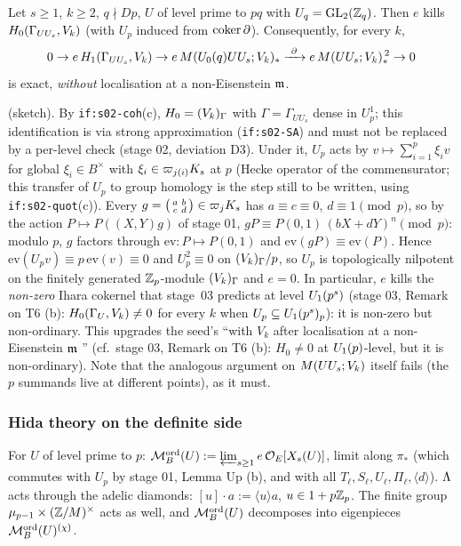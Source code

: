 \begin{proposition}\label{prop:s04-ekillsVk}
Let $s\ge1$, $k\ge2$, $q\nmid Dp$, $U$ of level prime to $pq$ with $U_q=\mathrm{GL}_2(\mathbb{Z}_q)$. Then $e$ kills $H_0(\Gamma_{UU_s},V_k)$ (with
$U_p$ induced from $\operatorname{coker}\partial$). Consequently, for every $k$,
\[0\to e\,H_1(\Gamma_{UU_s},\Vk)\to e\,\Brandt{\Uzero{q}UU_s}{\Vk}_*\xrightarrow{\ \partial\ }e\,\Brandt{UU_s}{\Vk}_*^{\,2}\to0\]
is exact, \emph{without} localisation at a non-Eisenstein $\mathfrak{m}$.
\end{proposition}
\noindent\sttoprove{} (sketch). By \texttt{if:s02-coh}(c), $H_0=(V_k)_{\Gamma}$ with $\Gamma=\Gamma_{UU_s}$ dense in
$U^1_p$; this identification is \stpmc{} via strong approximation (\texttt{if:s02-SA}) and must not be replaced by a per-level
check (stage 02, deviation D3). Under it, $U_p$ acts by $v\mapsto\sum_{i=1}^{p}\xi_iv$ for global $\xi_i\in B^\times$ with
$\xi_i\in\varpi_{j(i)}K_{s}$ at $p$ (Hecke operator of the commensurator; this transfer of $U_p$ to group homology is the step
still to be written, using \texttt{if:s02-quot}(c)). Every $g=\left(\begin{smallmatrix}a&b\\c&d\end{smallmatrix}\right)\in\varpi_jK_{s}$
has $a\equiv c\equiv0$, $d\equiv1\pmod p$, so by the action $P\mapsto P((X,Y)g)$ of stage 01, $gP\equiv P(0,1)\,(bX+dY)^n\pmod p$: modulo $p$, $g$ factors
through $\mathrm{ev}:P\mapsto P(0,1)$ and $\mathrm{ev}(gP)\equiv\mathrm{ev}(P)$. Hence $\mathrm{ev}(U_pv)\equiv p\,\mathrm{ev}(v)\equiv0$ and
$U_p^2\equiv0$ on $(V_k)_\Gamma/p$, so $U_p$ is topologically nilpotent on the finitely generated $\mathbb{Z}_p$-module $(V_k)_\Gamma$ and $e=0$.
In particular, $e$ kills the \emph{non-zero} Ihara cokernel that stage~03 predicts at level $U_1(p^s)$ (stage 03, Remark on
T6 (b): $H_0(\Gamma_U,V_k)\ne0$ for every $k$ when $U_p\subseteq U_1(p^s)_p$): it is non-zero but non-ordinary.
This upgrades the seed's ``with $V_k$ after localisation at a non-Eisenstein $\mathfrak{m}$ \stsketch'' (cf.\ stage 03, Remark on T6 (b):
$H_0\ne0$ at $U_1(p)$-level, but it is non-ordinary). Note that the analogous argument on $M(UU_s;V_k)$ itself fails (the
$p$ summands live at different points), as it must.

\subsubsection{Hida theory on the definite side}

\begin{definition}\label{def:s04-Mord}
For $U$ of level prime to $p$: $\mathcal{M}^{\mathrm{ord}}_B(U):=\varprojlim_{s\ge1}e\,\mathcal{O}_E[X_s(U)]$, limit along $\pi_*$ (which commutes with $U_p$ by
stage 01, Lemma Up (b), and with all $T_\ell,S_\ell,U_\ell,\Pi_\ell,\langle d\rangle$). $\Lambda$ acts through the adelic diamonds:
$[u]\cdot a:=\langle u\rangle a$, $u\in1+p\mathbb{Z}_p$. The finite group $\mu_{p-1}\times(\mathbb{Z}/M)^\times$ acts as well, and $\mathcal{M}^{\mathrm{ord}}_B(U)$
decomposes into eigenpieces $\mathcal{M}^{\mathrm{ord}}_B(U)^{(\chi)}$.
\end{definition}

